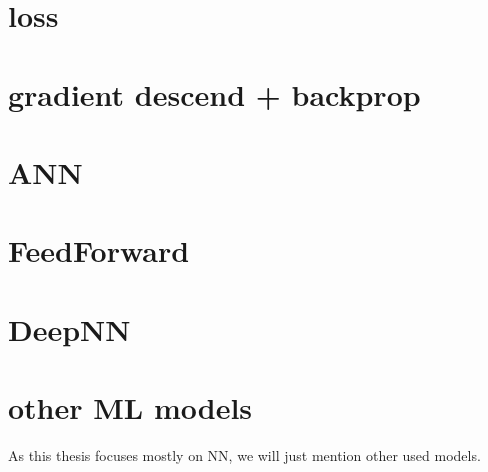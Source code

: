
\section{loss}
\section{gradient descend + backprop}
\section{ANN}
\section{FeedForward}
\section{DeepNN}
\section{other ML models}

As this thesis focuses mostly on NN, we will just mention other used models.



